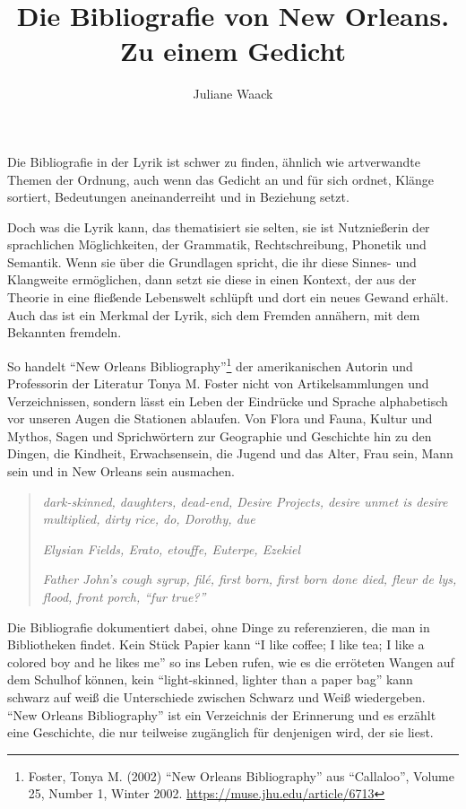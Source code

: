 \documentclass[a4paper,
fontsize=11pt,
oneside,
numbers=noperiodatend,
parskip=half-,
bibliography=totoc,
final
]{scrartcl}
\title{\LARGE{Die Bibliografie von New Orleans. Zu einem Gedicht}} %
\author{Juliane Waack} %
\date{}
\begin{document}
\maketitle
\thispagestyle{fancyplain} 


Die Bibliografie in der Lyrik ist schwer zu finden, ähnlich wie
artverwandte Themen der Ordnung, auch wenn das Gedicht an und für sich
ordnet, Klänge sortiert, Bedeutungen aneinanderreiht und in Beziehung
setzt.

Doch was die Lyrik kann, das thematisiert sie selten, sie ist
Nutznießerin der sprachlichen Möglichkeiten, der Grammatik,
Rechtschreibung, Phonetik und Semantik. Wenn sie über die Grundlagen
spricht, die ihr diese Sinnes- und Klangweite ermöglichen, dann setzt
sie diese in einen Kontext, der aus der Theorie in eine fließende
Lebenswelt schlüpft und dort ein neues Gewand erhält. Auch das ist ein
Merkmal der Lyrik, sich dem Fremden annähern, mit dem Bekannten
fremdeln.

So handelt \enquote{New Orleans Bibliography}\footnote{Foster, Tonya M.
  (2002) \enquote{New Orleans Bibliography} aus \enquote{Callaloo},
  Volume 25, Number 1, Winter 2002.
  \url{https://muse.jhu.edu/article/6713}} der amerikanischen Autorin
und Professorin der Literatur Tonya M. Foster nicht von
Artikelsammlungen und Verzeichnissen, sondern lässt ein Leben der
Eindrücke und Sprache alphabetisch vor unseren Augen die Stationen
ablaufen. Von Flora und Fauna, Kultur und Mythos, Sagen und
Sprichwörtern zur Geographie und Geschichte hin zu den Dingen, die
Kindheit, Erwachsensein, die Jugend und das Alter, Frau sein, Mann sein
und in New Orleans sein ausmachen.

\begin{quote}
\emph{dark-skinned, daughters, dead-end, Desire Projects, desire unmet
is desire multiplied, dirty rice, do, Dorothy, due}

\emph{Elysian Fields, Erato, etouffe, Euterpe, Ezekiel}

\emph{Father John's cough syrup, filé, first born, first born done died,
fleur de lys, flood, front porch, \enquote{fur true?}}
\end{quote}

Die Bibliografie dokumentiert dabei, ohne Dinge zu referenzieren, die
man in Bibliotheken findet. Kein Stück Papier kann \enquote{I like
coffee; I like tea; I like a colored boy and he likes me} so ins Leben
rufen, wie es die erröteten Wangen auf dem Schulhof können, kein
\enquote{light-skinned, lighter than a paper bag} kann schwarz auf weiß
die Unterschiede zwischen Schwarz und Weiß wiedergeben. \enquote{New
Orleans Bibliography} ist ein Verzeichnis der Erinnerung und es erzählt
eine Geschichte, die nur teilweise zugänglich für denjenigen wird, der
sie liest.
\end{document}
